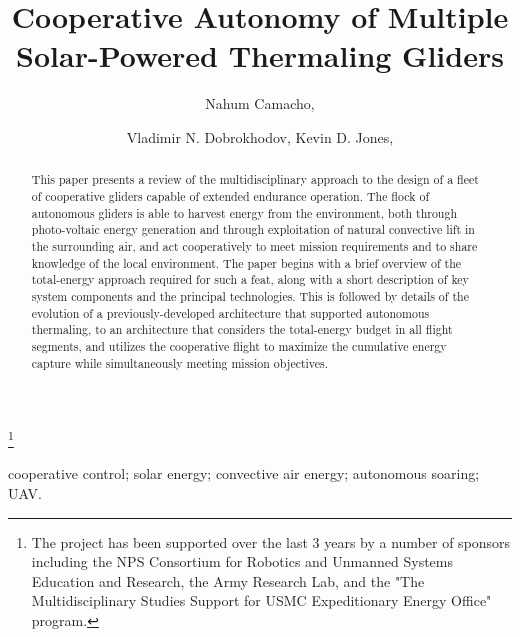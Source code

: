 \documentclass{ifacconf}
\begin{document}
\begin{frontmatter}

\title{Cooperative Autonomy of Multiple Solar-Powered Thermaling Gliders
}

\thanks[footnoteinfo]{The project has been supported over the last 3 years by a number of
sponsors including the NPS Consortium for Robotics and Unmanned Systems
Education and Research, the Army Research Lab, and the "The Multidisciplinary
Studies Support for USMC Expeditionary Energy Office" program.}

\author[First]{Nahum Camacho,}
\author[Second]{Vladimir N. Dobrokhodov, Kevin D. Jones,}

\address[First]{Graduate student at the Department  of Mechanical and Aerospace Engineering,
Naval
Postgraduate School, Monterey, CA 93943 USA (e-mail: ncamacho@nps.edu)}
\address[Second]{Research Associate Professors at the Department  of Mechanical and Aerospace
Engineering, Naval Postgraduate School, Monterey, CA 93943 USA (e-mail: {vndobrok,
kdjones}@nps.edu)}


\begin{keyword}                           %
cooperative control; solar energy; convective air energy; autonomous soaring;
UAV.
\end{keyword}                             %


\begin{abstract}                          %
This paper presents a review of the multidisciplinary approach to the
design of a fleet of cooperative gliders capable of extended endurance
operation. The flock of autonomous gliders is able to harvest energy from
the environment, both through photo-voltaic energy generation and through
exploitation of natural convective lift in the surrounding air, and act
cooperatively to meet mission requirements and to share knowledge of the
local environment. The paper begins with a brief overview of the
total-energy approach required for such a feat, along with a short
description of key system components and the principal technologies. This
is followed by details of the evolution of a previously-developed
architecture that supported autonomous thermaling, to an architecture that
considers the total-energy budget in all flight segments, and utilizes the
cooperative flight to maximize the cumulative energy capture while
simultaneously meeting mission objectives.
\end{abstract}

\end{frontmatter}
\end{document}
